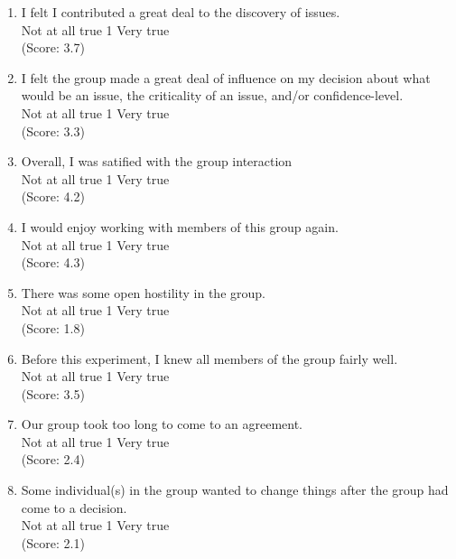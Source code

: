 \begin{enumerate}
\item I felt I contributed a great deal to the discovery of issues.
\\
Not at all true \hfill 1     \hfill Very true\\
(Score: 3.7)

\item I felt the group made a great deal of influence on my decision
about what would be an issue, the criticality of an issue, and/or confidence-level.
\\
Not at all true \hfill 1     \hfill Very true\\
(Score: 3.3)

\item Overall, I was satified with the group interaction
\\
Not at all true \hfill 1     \hfill Very true\\
(Score: 4.2)

\item I would enjoy working with members of this group again.
\\
Not at all true \hfill 1     \hfill Very true\\
(Score: 4.3)

\item There was some open hostility in the group.
\\
Not at all true \hfill 1     \hfill Very true\\
(Score: 1.8)

\item Before this experiment, I knew all members of the group fairly well. 
\\
Not at all true \hfill 1     \hfill Very true\\
(Score: 3.5)

\item Our group took too long to come to an agreement.
\\
Not at all true \hfill 1     \hfill Very true\\
(Score: 2.4)

\item Some individual(s) in the group wanted to change things after
the group had come to a decision.
\\
Not at all true \hfill 1     \hfill Very true\\
(Score: 2.1)


\end{enumerate}
